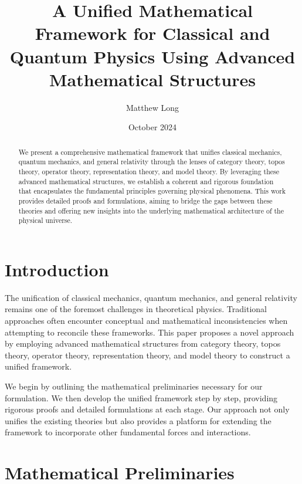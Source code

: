 \documentclass[12pt]{article}
\begin{document}
\title{A Unified Mathematical Framework for Classical and Quantum Physics Using Advanced Mathematical Structures}
\author{Matthew Long}
\date{October 2024}

\maketitle

\begin{abstract}
We present a comprehensive mathematical framework that unifies classical mechanics, quantum mechanics, and general relativity through the lenses of category theory, topos theory, operator theory, representation theory, and model theory. By leveraging these advanced mathematical structures, we establish a coherent and rigorous foundation that encapsulates the fundamental principles governing physical phenomena. This work provides detailed proofs and formulations, aiming to bridge the gaps between these theories and offering new insights into the underlying mathematical architecture of the physical universe.
\end{abstract}

\tableofcontents

\section{Introduction}

The unification of classical mechanics, quantum mechanics, and general relativity remains one of the foremost challenges in theoretical physics. Traditional approaches often encounter conceptual and mathematical inconsistencies when attempting to reconcile these frameworks. This paper proposes a novel approach by employing advanced mathematical structures from category theory, topos theory, operator theory, representation theory, and model theory to construct a unified framework.

We begin by outlining the mathematical preliminaries necessary for our formulation. We then develop the unified framework step by step, providing rigorous proofs and detailed formulations at each stage. Our approach not only unifies the existing theories but also provides a platform for extending the framework to incorporate other fundamental forces and interactions.

\section{Mathematical Preliminaries}
\end{document}
